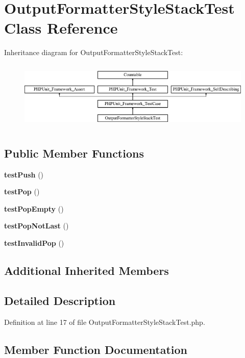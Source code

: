 \section{Output\+Formatter\+Style\+Stack\+Test Class Reference}
\label{class_symfony_1_1_component_1_1_console_1_1_tests_1_1_formatter_1_1_output_formatter_style_stack_test}
Inheritance diagram for Output\+Formatter\+Style\+Stack\+Test\+:\begin{figure}[H]
\begin{center}
\leavevmode
\includegraphics[height=3.303835cm]{class_symfony_1_1_component_1_1_console_1_1_tests_1_1_formatter_1_1_output_formatter_style_stack_test}
\end{center}
\end{figure}
\subsection*{Public Member Functions}
\begin{DoxyCompactItemize}
\item 
{\bf test\+Push} ()
\item 
{\bf test\+Pop} ()
\item 
{\bf test\+Pop\+Empty} ()
\item 
{\bf test\+Pop\+Not\+Last} ()
\item 
{\bf test\+Invalid\+Pop} ()
\end{DoxyCompactItemize}
\subsection*{Additional Inherited Members}


\subsection{Detailed Description}


Definition at line 17 of file Output\+Formatter\+Style\+Stack\+Test.\+php.



\subsection{Member Function Documentation}
